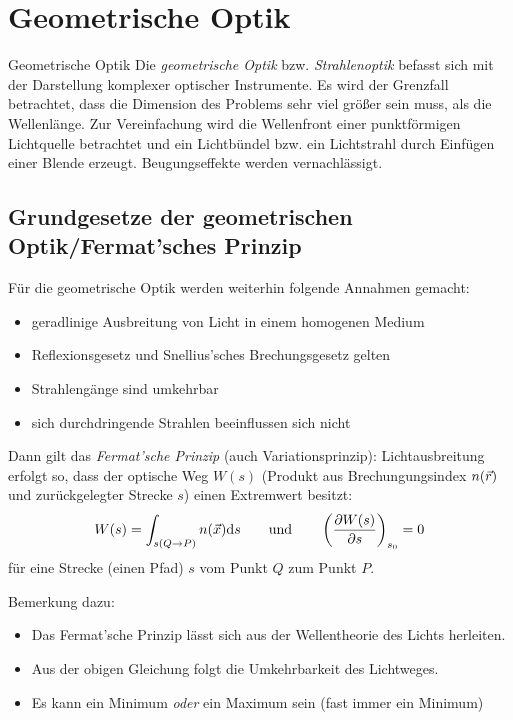 \chapter{Geometrische Optik}
Geometrische Optik
Die \emph{geometrische Optik}
bzw. \emph{Strahlenoptik} befasst sich mit der
Darstellung komplexer optischer Instrumente.
Es wird der Grenzfall betrachtet, dass die Dimension des Problems sehr
viel größer sein muss, als die Wellenlänge.
Zur Vereinfachung wird die Wellenfront einer punktförmigen Lichtquelle
betrachtet und ein Lichtbündel bzw. ein Lichtstrahl durch Einfügen
einer Blende erzeugt. Beugungseffekte werden vernachlässigt.

\section[Fermat'sches Prinzip]
{Grundgesetze der geometrischen Optik/Fermat'sches Prinzip}
Für die geometrische Optik werden weiterhin folgende Annahmen gemacht:
\begin{itemize}
\item geradlinige Ausbreitung von Licht in einem homogenen Medium
\item Reflexionsgesetz und Snellius'sches Brechungsgesetz gelten
\item Strahlengänge sind umkehrbar
\item sich durchdringende Strahlen beeinflussen sich nicht
\end{itemize}
Dann gilt das \emph{Fermat'sche Prinzip}
(auch Variationsprinzip):
Lichtausbreitung erfolgt so, dass der optische Weg $W(s)$%
(Produkt aus Brechungungsindex $n(\vecr)$ und zurückgelegter Strecke
$s$) einen Extremwert besitzt:
\begin{gather*}
  W(s) = \int_{s(Q\to P)}n(\vecx)\dd s
  \qquad\text{und}\qquad
  \left( \dif[W(s)]{s} \right)_{s_0} = 0
\end{gather*}%
%
für eine Strecke (einen Pfad) $s$ vom Punkt $Q$ zum Punkt $P$.

Bemerkung dazu:
\begin{itemize}
\item Das Fermat'sche Prinzip lässt sich aus der Wellentheorie des
  Lichts herleiten.
\item Aus der obigen Gleichung folgt die Umkehrbarkeit des Lichtweges.
\item Es kann ein Minimum \emph{oder} ein Maximum sein (fast immer ein
  Minimum)
\end{itemize}

